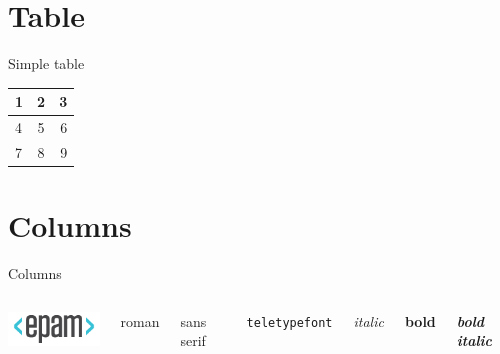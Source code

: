 \section{Table}

\begin{frame}{Simple table}

    \begin{tabular}{| l || c | r |}
      \hline
	  1 & 2 & 3 \\ \hline 
	  4 & 5 & 6 \\
	  7 & 8 & 9 \\
      \hline
    \end{tabular}
\end{frame}

\section{Columns}

\begin{frame}{Columns}
	\begin{columns}
		\center\includegraphics[width=3cm]{epam}
		
		{\rmfamily roman}
		
		{\sffamily sans serif}
		
		{\tt teletypefont}
		
		{\it italic}
		
		{\bf bold}
		
		\textit{\textbf{bold italic}}
	\end{columns}
\end{frame}



